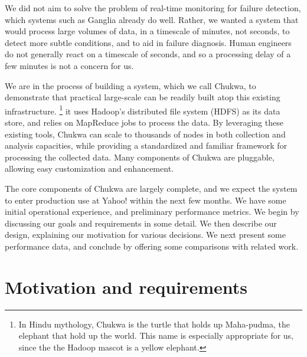 \documentclass[letterpaper,twocolumn,10pt]{article}
\begin{document}
We did not aim to solve the problem of real-time monitoring for failure detection, which systems such as Ganglia already do well. Rather, we wanted a system that would process large volumes of data, in a timescale of minutes, not seconds, to detect more subtle conditions, and to aid in failure diagnosis. Human engineers do not generally react on a timescale of seconds, and so a processing delay of a few minutes is not a concern for us.


 
 We are in the process of building a system, which we call Chukwa, to demonstrate that practical large-scale can be readily built atop this existing infrastructure. \footnote{In Hindu mythology, Chukwa is the turtle that holds up Maha-pudma, the elephant that hold up the world.  This name is especially appropriate for us, since the the Hadoop mascot is a yellow elephant.}   
 it uses Hadoop's distributed file system (HDFS) as its data store, and relies on MapReduce jobs to process the data. By leveraging these existing tools, Chukwa can scale to thousands of nodes in both collection and analysis capacities, while providing a standardized and familiar framework  for processing the collected data. Many components of Chukwa are pluggable, allowing easy customization and enhancement.
 
The core components of Chukwa are largely complete, and we expect the system to enter production use at Yahoo! within the next few months. We have some initial operational experience, and preliminary performance metrics.    We begin by discussing our goals and requirements in some detail.  We then describe our design, explaining our motivation for various decisions. We next present some performance data, and conclude by offering some comparisons with related work.

\section{Motivation and requirements} 
\end{document}
